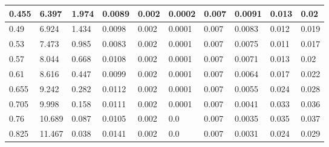 \begin{landscape}
\begin{table}
\begin{tabular}{|p{1cm}|p{1cm}|p{1.5cm}|p{1.5cm}|p{2cm}|p{2cm}|p{1.5cm}|p{1.5cm}|p{2.5cm}|p{2.5cm}|}
		0.455 & 6.397  & 1.974         & 0.0089            & 0.002              & 0.0002               & 0.007              & 0.0091                & 0.013             & 0.02                \\ \hline
		0.49  & 6.924  & 1.434         & 0.0098            & 0.002              & 0.0001               & 0.007              & 0.0083                & 0.012             & 0.019               \\ \hline
		0.53  & 7.473  & 0.985         & 0.0083            & 0.002              & 0.0001               & 0.007              & 0.0075                & 0.011             & 0.017               \\ \hline
		0.57  & 8.044  & 0.668         & 0.0108            & 0.002              & 0.0001               & 0.007              & 0.0071                & 0.013             & 0.02                \\ \hline
		0.61  & 8.616  & 0.447         & 0.0099            & 0.002              & 0.0001               & 0.007              & 0.0064                & 0.017             & 0.022               \\ \hline
		0.655 & 9.242  & 0.282         & 0.0112            & 0.002              & 0.0001               & 0.007              & 0.0055                & 0.024             & 0.028               \\ \hline
		0.705 & 9.998  & 0.158         & 0.0111            & 0.002              & 0.0001               & 0.007              & 0.0041                & 0.033             & 0.036               \\ \hline
		0.76  & 10.689 & 0.087         & 0.0105            & 0.002              & 0.0                  & 0.007              & 0.0035                & 0.035             & 0.037               \\ \hline
		0.825 & 11.467 & 0.038         & 0.0141            & 0.002              & 0.0                  & 0.007              & 0.0031                & 0.024             & 0.029               \\ \hline
	\end{tabular}
	\end{table}
\end{landscape}

\restoregeometry
\pagestyle{plain}

